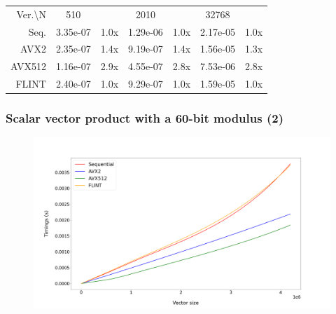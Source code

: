 \documentclass[10pt]{beamer}
\begin{document}
\begin{frame}
\begin{table}[h!]
        \begin{tabular}{|r|*{3}{c c|}}
            \hline
            \rowcolor{myGray}
            \multicolumn{7}{|c|}{\textsc{Zen 4}} \\
    
            \hline
            \rowcolor{myGray}
            Ver.\textbackslash N & 510 & & 2010 & & 32768 & \\
            \hline
            \cellcolor{myGray} Seq. & 3.35e-07 & 1.0x & 1.29e-06 & 1.0x & 2.17e-05 & 1.0x \\
            \hline
            \cellcolor{myGray} AVX2 & 2.35e-07 & 1.4x & 9.19e-07 & 1.4x & 1.56e-05 & 1.3x \\
            \hline
            \cellcolor{myGray} AVX512 & 1.16e-07 & 2.9x & 4.55e-07 & 2.8x & 7.53e-06 & 2.8x \\
            \hline
            \cellcolor{myGray} FLINT & 2.40e-07 & 1.0x & 9.29e-07 & 1.0x & 1.59e-05 & 1.0x \\
            \hline
        \end{tabular}
    \end{table}
\end{frame}

\begin{frame}
    \frametitle{Scalar vector product with a 60-bit modulus (2)}

    \begin{figure}[h!]
        \begin{center}
            \includegraphics[width=1\textwidth]{scalar-vector-mod_argiope.png}
        \end{center}
    \end{figure}
\end{frame}
\end{document}
